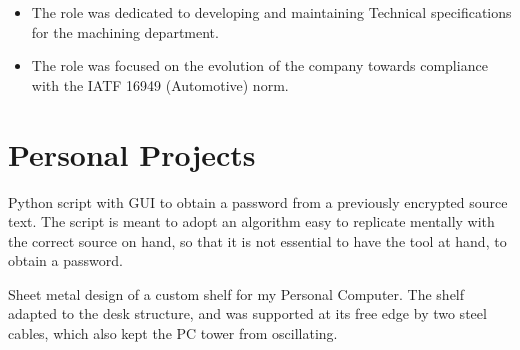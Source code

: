 \documentclass[a4paper, 12pt]{my_cv}
\newlength\MainWidth
\begin{document}
\begin{textblock*}{\MainWidth}
          
    \begin{itemize}
        \item {}

    The role was dedicated to developing and maintaining Technical specifications for the machining department.

        \item {}

    The role was focused on the evolution of the company towards compliance with the IATF 16949 (Automotive) norm.
    \end{itemize}

    \section{Personal Projects}

    
    Python script with GUI to obtain a password from a previously encrypted source text. The script is meant to adopt an algorithm easy to replicate mentally with the correct source on hand, so that it is not essential to have the tool at hand, to obtain a password.

    
    Sheet metal design of a custom shelf for my Personal Computer. The shelf adapted to the desk structure, and was supported at its free edge by two steel cables, which also kept the PC tower from oscillating.
    
\end{textblock*}
\end{document}
